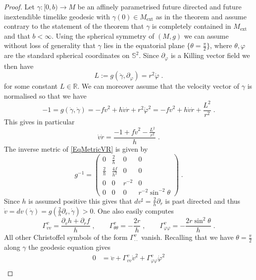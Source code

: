 \documentclass[reqno]{article}
\newcommand{\R}{\mathbb{R}}
\newcommand{\Mext}{M_{\mathrm{ext}}}
\newcommand{\rd}{\partial}
\begin{document}
\begin{proof}
Let $\gamma : [0,b) \to M$ be an affinely parametrised future directed and future inextendible timelike geodesic with $\gamma(0) \in \Mext$ as in the theorem and assume contrary to the statement of the theorem that $\gamma$ is completely contained in $\Mext$ and that $b< \infty$. Using the spherical symmetry of $(M,g)$ we can assume without loss of generality that $\gamma$ lies in the equatorial plane $\{ \theta = \frac{\pi}{2}\}$, where $\theta, \varphi$ are the standard spherical coordinates on $\mathbb{S}^2$. Since $\rd_\varphi$ is a Killing vector field we then have 
\begin{equation}
\label{EqVelPL}
L := g(\dot{\gamma}, \rd_\varphi) = r^2 \dot{\varphi} \;.
\end{equation}
 for some constant $L \in \R$.
We can moreover assume that the  velocity vector of $\gamma$ is normalised so that we have $$-1 = g(\dot{\gamma}, \dot{\gamma}) = -f \dot{v}^2 + h \dot{v} \dot{r} + r^2 \dot{\varphi}^2 = -f \dot{v}^2 + h \dot{v} \dot{r} + \frac{L^2}{r^2} \;.$$
This gives in particular
\begin{equation}
\label{EqVdotRdot}
\dot{v} \dot{r} = \frac{-1 + f\dot{v}^2 - \frac{L^2}{r^2}}{h} \;.
\end{equation}
The inverse metric of \eqref{EqMetricVR} is given by
\begin{equation*}
g^{-1} = \begin{pmatrix} 0 & \frac{2}{h} & 0 & 0 \\ \frac{2}{h} & \frac{4f}{h^2} & 0 & 0 \\
0 & 0 & r^{-2} & 0 \\ 0 & 0 & 0 & r^{-2} \sin^{-2}\theta \end{pmatrix} \;.
\end{equation*}
Since $h$ is assumed positive this gives that $dv^\sharp = \frac{2}{h} \rd_r$ is past directed and thus $\dot{v} = dv(\dot{\gamma}) = g(\frac{2}{h} \rd_r, \dot{\gamma}) >0$.
One also easily computes $$\Gamma^v_{vv} = \frac{\rd_v h + \rd_r f}{h} \;, \qquad \Gamma^v_{\theta \theta} = - \frac{2r}{h} \;, \qquad \Gamma^v_{\varphi \varphi} = -\frac{2r \sin^2 \theta}{h} \;.$$ All other Christoffel symbols of the form $\Gamma^v_{\cdot \cdot}$ vanish. Recalling that we have $\theta = \frac{\pi}{2}$ along $\gamma$ the geodesic equation gives
\begin{equation*}
\begin{split}
0 &= \ddot{v} + \Gamma^v_{vv} \dot{v}^2 + \Gamma^v_{\varphi \varphi} \dot{\varphi}^2 \\

\end{split}
\end{equation*}
\end{proof}
\end{document}
